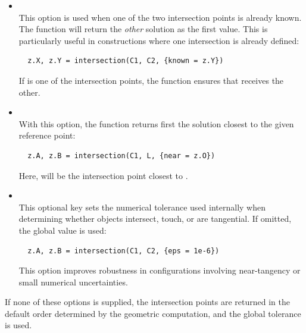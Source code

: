 \begin{itemize}
  \item {}  \\
  This option is used when one of the two intersection points is already known.
  The function will return the \emph{other} solution as the first value.
  This is particularly useful in constructions where one intersection is already defined:

  \begin{mybox}
  \begin{verbatim}
  z.X, z.Y = intersection(C1, C2, {known = z.Y})
  \end{verbatim}
  \end{mybox}

  If  is one of the intersection points, the function ensures that  receives the other.

  \item {}  \\
  With this option, the function returns first the solution closest to the given reference point:

  \begin{mybox}
  \begin{verbatim}
  z.A, z.B = intersection(C1, L, {near = z.O})
  \end{verbatim}
  \end{mybox}

  Here,  will be the intersection point closest to .

  \item {}  \\
  This optional key sets the numerical tolerance used internally when determining
  whether objects intersect, touch, or are tangential.
  If omitted, the global value  is used:

  \begin{mybox}
  \begin{verbatim}
  z.A, z.B = intersection(C1, C2, {eps = 1e-6})
  \end{verbatim}
  \end{mybox}

  This option improves robustness in configurations involving near-tangency or
  small numerical uncertainties.

\end{itemize}

If none of these options is supplied, the intersection points are returned in the default order determined by the geometric computation, and the global tolerance  is used.

